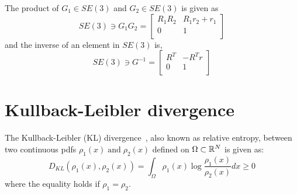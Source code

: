 The product of $G_1 \in SE(3)$ and $G_2 \in SE(3)$ is given as 
\begin{equation}
 SE(3) \ni G_1G_2 =  
\begin{bmatrix}
    R_1R_2 & R_1r_2 +r_1 \\
    0 & 1   \\
   \end{bmatrix}
\label{a3:eq8}    
\end{equation}
and the inverse of an element in $SE(3)$ is, 
\begin{equation}
 SE(3) \ni G^{-1} =  
\begin{bmatrix}
    R^T & -R^Tr \\
    0 & 1   \\
   \end{bmatrix}
\label{a3:eq9}    
\end{equation}

\section{Kullback-Leibler divergence} \label{a3:s4}
The Kullback-Leibler (KL) divergence~\cite{kld}, also known as relative entropy, between two continuous 
pdfs $\rho_1(x) \; \text{and} \; \rho_2(x)$ defined on $\Omega \subset {\mathbb R}^N$ is given as: 
\begin{equation}
D_{KL}(\rho_1(x),\rho_2(x)) = \int_{\Omega}\rho_1(x)\log\frac{\rho_1(x)}{\rho_2(x)}dx \geq 0  
\label{a3:eq11}    
\end{equation}
where the equality holds if $\rho_1=\rho_2$. 

